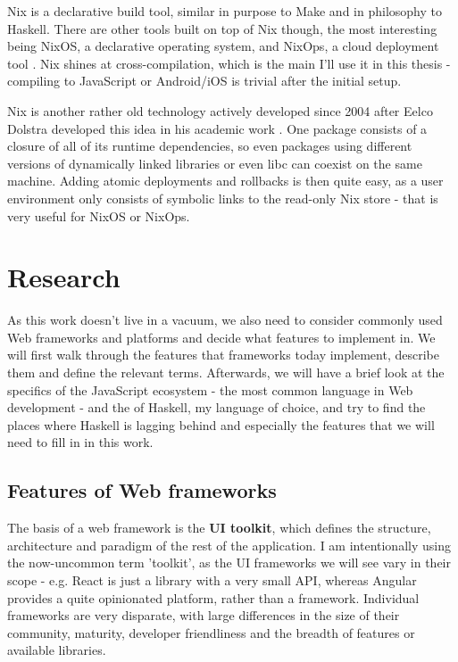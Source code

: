 \documentclass[english,odsaz]{fitthesis}
\begin{document}
Nix is a declarative build tool, similar in purpose to Make and in philosophy to
Haskell. There are other tools built on top of Nix though, the most interesting
being NixOS, a declarative operating system, and NixOps, a cloud deployment tool
\cite{dolstra2008nixos}. Nix shines at cross-compilation, which is the main I'll
use it in this thesis - compiling to JavaScript or Android/iOS is trivial after
the initial setup.

Nix is another rather old technology actively developed since 2004 after Eelco
Dolstra developed this idea in his academic work \cite{dolstra2006purely}. One
package consists of a closure of all of its runtime dependencies, so even
packages using different versions of dynamically linked libraries or even libc
can coexist on the same machine. Adding atomic deployments and rollbacks is then
quite easy, as a user environment only consists of symbolic links to the
read-only Nix store - that is very useful for NixOS or NixOps.

\chapter{Research}
\label{sec:org906c3d3}
As this work doesn't live in a vacuum, we also need to consider commonly used
Web frameworks and platforms and decide what features to implement in. We will
first walk through the features that frameworks today implement, describe them
and define the relevant terms. Afterwards, we will have a brief look at the
specifics of the JavaScript ecosystem - the most common language in Web
development - and the of Haskell, my language of choice, and try to find the
places where Haskell is lagging behind and especially the features that we will
need to fill in in this work.

\section{Features of Web frameworks}
\label{sec:orgfc5ac81}
The basis of a web framework is the \textbf{UI toolkit}, which defines the structure,
architecture and paradigm of the rest of the application. I am intentionally
using the now-uncommon term 'toolkit', as the UI frameworks we will see vary in
their scope - e.g. React is just a library with a very small API, whereas
Angular provides a quite opinionated platform, rather than a
framework. Individual frameworks are very disparate, with large differences in
the size of their community, maturity, developer friendliness and the breadth of
features or available libraries.
\end{document}
